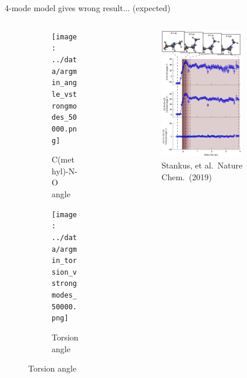 \documentclass{beamer}
\begin{document}
\begin{frame}{4-mode model gives wrong result... (expected)}
\begin{columns}
\begin{column}{0.5\textwidth}
\begin{figure}
	\begin{subfigure}[b]{\textwidth}
		\centering
		\texttt{[image: ../data/argmin\_angle\_vstrongmodes\_50000.png]}
		\caption{C(methyl)-N-O angle}
	\end{subfigure}
	\begin{subfigure}[b]{\textwidth}
		\centering
		\texttt{[image: ../data/argmin\_torsion\_vstrongmodes\_50000.png]}
		\caption{Torsion angle}
	\end{subfigure}
\end{figure}
\end{column}

\begin{column}{0.5\textwidth}
\begin{figure}[H]
	\centering
	\includegraphics[width=0.7\textwidth]{stankus_angle_plots.png}
	\caption{{\tiny Stankus, et al.\ Nature Chem.\ (2019)}}
	\label{fig:nmm-geom}
\end{figure}
\end{column}
\end{columns}
\end{frame}
\end{document}

